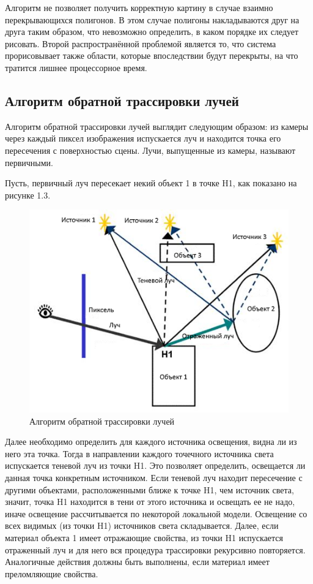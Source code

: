 \documentclass[12pt,a4paper,oneside]{report}
\begin{document}
 	 Алгоритм не позволяет получить корректную картину в случае взаимно перекрывающихся полигонов. В этом случае полигоны накладываются друг на друга таким образом, что невозможно определить, в каком порядке их следует рисовать. 	
 	Второй распространённой проблемой является то, что система прорисовывает также области, которые впоследствии будут перекрыты, на что тратится лишнее процессорное время.
 	
 	\subsection{Алгоритм обратной трассировки лучей}
 	
 	 \quad Алгоритм обратной трассировки лучей выглядит следующим образом: из камеры через каждый пиксел изображения испускается луч и находится точка его пересечения с поверхностью сцены. Лучи, выпущенные из камеры, называют первичными. 
 	
 	 Пусть, первичный луч пересекает некий объект 1 в точке H1, как показано на рисунке 1.3.
 	
 	\begin{figure}[H]
 		\centering
 		\includegraphics[scale=0.8]{ray}
 		\caption{Алгоритм обратной трассировки лучей}
 	\end{figure}
 
 	 Далее необходимо определить для каждого источника освещения, видна ли из него эта точка. Тогда в направлении каждого точечного источника света испускается теневой луч из точки H1. Это позволяет определить, освещается ли данная точка конкретным источником. Если теневой луч находит пересечение с другими объектами, расположенными ближе к точке H1, чем источник света, значит, точка H1 находится в тени от этого источника и освещать ее не надо, иначе освещение рассчитывается по некоторой локальной модели. Освещение со всех видимых (из точки H1) источников света складывается. Далее, если материал объекта 1 имеет отражающие свойства, из точки H1 испускается отраженный луч и для него вся процедура трассировки рекурсивно повторяется. Аналогичные действия должны быть выполнены, если материал имеет преломляющие свойства.
 
\end{document}
